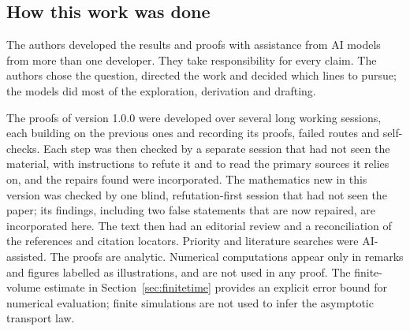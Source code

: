 \subsection*{How this work was done}

The authors developed the results and proofs with assistance from AI models from more than one developer. They take responsibility for every claim. The authors chose the question, directed the work and decided which lines to pursue; the models did most of the exploration, derivation and drafting.

The proofs of version 1.0.0 were developed over several long working sessions, each building on the previous ones and recording its proofs, failed routes and self-checks. Each step was then checked by a separate session that had not seen the material, with instructions to refute it and to read the primary sources it relies on, and the repairs found were incorporated. The mathematics new in this version was checked by one blind, refutation-first session that had not seen the paper; its findings, including two false statements that are now repaired, are incorporated here. The text then had an editorial review and a reconciliation of the references and citation locators. Priority and literature searches were AI-assisted. The proofs are analytic. Numerical computations appear only in remarks and figures labelled as illustrations, and are not used in any proof. The finite-volume estimate in Section~\ref{sec:finitetime} provides an explicit error bound for numerical evaluation; finite simulations are not used to infer the asymptotic transport law.
